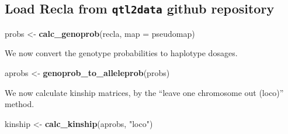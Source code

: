 \documentclass[oneside]{book}
\newenvironment{Shaded}{\begin{snugshade}}{\end{snugshade}}
\newcommand{\CommentTok}[1]{\textcolor[rgb]{0.56,0.35,0.01}{\textit{#1}}}
\newcommand{\DataTypeTok}[1]{\textcolor[rgb]{0.13,0.29,0.53}{#1}}
\newcommand{\DecValTok}[1]{\textcolor[rgb]{0.00,0.00,0.81}{#1}}
\newcommand{\FloatTok}[1]{\textcolor[rgb]{0.00,0.00,0.81}{#1}}
\newcommand{\KeywordTok}[1]{\textcolor[rgb]{0.13,0.29,0.53}{\textbf{#1}}}
\newcommand{\NormalTok}[1]{#1}
\newcommand{\OperatorTok}[1]{\textcolor[rgb]{0.81,0.36,0.00}{\textbf{#1}}}
\newcommand{\OtherTok}[1]{\textcolor[rgb]{0.56,0.35,0.01}{#1}}
\newcommand{\StringTok}[1]{\textcolor[rgb]{0.31,0.60,0.02}{#1}}
\begin{document}
\hypertarget{load-recla-from-qtl2data-github-repository}{%
\subsection{\texorpdfstring{Load Recla from \texttt{qtl2data} github
repository}{Load Recla from qtl2data github repository}}\label{load-recla-from-qtl2data-github-repository}}

\begin{Shaded}
\end{Shaded}

\begin{Shaded}
\begin{Highlighting}[]
\NormalTok{probs <-}\StringTok{ }\KeywordTok{calc_genoprob}\NormalTok{(recla, }\DataTypeTok{map =}\NormalTok{ pseudomap)}
\end{Highlighting}
\end{Shaded}

We now convert the genotype probabilities to haplotype dosages.

\begin{Shaded}
\begin{Highlighting}[]
\NormalTok{aprobs <-}\StringTok{ }\KeywordTok{genoprob_to_alleleprob}\NormalTok{(probs)}
\end{Highlighting}
\end{Shaded}

We now calculate kinship matrices, by the ``leave one chromosome out
(loco)'' method.

\begin{Shaded}
\begin{Highlighting}[]
\NormalTok{kinship <-}\StringTok{ }\KeywordTok{calc_kinship}\NormalTok{(aprobs, }\StringTok{"loco"}\NormalTok{)}
\end{Highlighting}
\end{Shaded}
\end{document}
